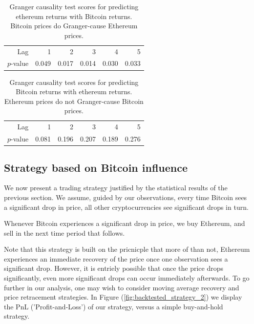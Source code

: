 \documentclass[twoside]{report}
\begin{document}
\begin{spacing}{1}
\begin{table}[!htbp]
\centering
\begin{tabular}{rrrrrr}
  \hline
 Lag & 1 & 2 & 3 & 4 & 5 \\ 
  $p$-value & 0.049 & 0.017 & 0.014 & 0.030 & 0.033 \\ 
   \hline
\end{tabular}
\caption{Granger causality test scores for predicting ethereum returns with Bitcoin returns. Bitcoin prices do Granger-cause Ethereum prices.} \label{tab:btc_cause_eth}
\end{table}

\begin{table}[!htbp]
\centering
\begin{tabular}{rrrrrr}
  \hline
 Lag & 1 & 2 & 3 & 4 & 5 \\ 
  $p$-value & 0.081 & 0.196 & 0.207 & 0.189 & 0.276 \\ 
   \hline
\end{tabular}
\caption{Granger causality test scores for predicting Bitcoin returns with ethereum returns. Ethereum prices do not Granger-cause Bitcoin prices.} \label{tab:eth_cause_btc}
\end{table}

\subsection{Strategy based on Bitcoin influence}

We now present a trading strategy justified by the statistical results of the previous section. We assume, guided by our observations, every time Bitcoin sees a significant drop in price, all other cryptocurrencies see significant drops in turn. \begin{strategy}
Whenever Bitcoin experiences a significant drop in price, we buy Ethereum, and sell in the next time period that follows.
\end{strategy} 
Note that this strategy is built on the pricnicple that more of than not,  Ethereum experiences an immediate recovery of the price once one observation sees a significant drop. However, it is entriely possible that once the price drops significantly, even more significant drops can occur immediately afterwards. To go further in our analysis, one may wish to consider moving average recovery and price retracement strategies. In Figure (\ref{fig:backtested_strategy_2}) we display the PnL ('Profit-and-Loss') of our strategy, versus a simple buy-and-hold strategy. 


\end{spacing}
\end{document}
